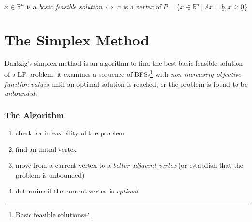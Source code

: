             \begin{theorem}
                $x \in \mathbb{R}^n$ is a \textit{basic feasible solution} $\Leftrightarrow$ $x$ is a \textit{vertex} of $P = \{x \in \mathbb{R}^n \,\vert\, Ax = \underline{b}, x \geq \underline{0}\}$
            \end{theorem}

    \section{The Simplex Method}
        Dantzig's simplex method is an algorithm to find the best basic feasible solution of a LP problem:
        it examines a sequence of BFSs\footnote{Basic feasible solutions} with \textit{non increasing objective function values} until an optimal solution is reached, or the problem is found to be \textit{unbounded}.

        \subsubsection{The Algorithm}
            \begin{enumerate}
                \item check for infeasibility of the problem
                \item find an initial vertex
                \item move from a current vertex to a \textit{better adjacent vertex} (or estabilish that the problem is unbounded)
                \item determine if the current vertex is \textit{optimal}
            \end{enumerate}

